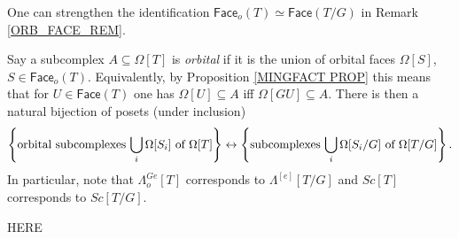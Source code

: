 \documentclass[a4paper,10pt
,draft
]{article}%
\begin{document}
\begin{remark}\label{ORB_HORN_REM}
One can strengthen the identification 
$\mathsf{Face}_o(T) \simeq \mathsf{Face}(T/G)$
in Remark \ref{ORB_FACE_REM}.

Say a subcomplex $A \subseteq \Omega[T]$ is \textit{orbital}
if it is the union of orbital faces $\Omega[S]$, $S\in \mathsf{Face}_o(T)$. 
Equivalently, by Proposition \ref{MINGFACT PROP} this means that for $U \in \mathsf{Face}(T)$
one has $\Omega[U] \subseteq A$ iff $\Omega[GU] \subseteq A$. There is then a natural bijection 
of posets (under inclusion)
\begin{equation}
	\left\{
	\text{orbital subcomplexes $\bigcup_i\Omega[S_i]$ of $\Omega[T]$}\right\}
		\leftrightarrow
	\left\{\text{subcomplexes $\bigcup_i\Omega[S_i/G]$ of $\Omega[T/G]$}\right\}.
\end{equation}
In particular, note that $\Lambda^{Ge}_o[T]$ corresponds to $\Lambda^{[e]}[T/G]$
and $Sc[T]$ corresponds to $Sc[T/G]$.
\end{remark}

{\color{red} HERE}
\end{document}
